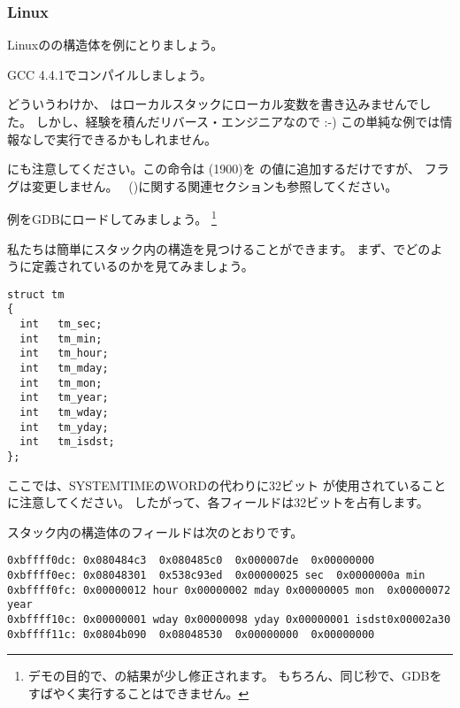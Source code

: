 ﻿\subsubsection{Linux}

Linuxのの構造体を例にとりましょう。



GCC 4.4.1でコンパイルしましょう。



どういうわけか、 \IDA はローカルスタックにローカル変数を書き込みませんでした。
しかし、経験を積んだリバース・エンジニアなので :-) この単純な例では情報なしで実行できるかもしれません。


にも注意してください。この命令は (1900)を \EAX の値に追加するだけですが、
フラグは変更しません。 \LEA{}~()に関する関連セクションも参照してください。


例をGDBにロードしてみましょう。
\footnote{デモの目的で、の結果が少し修正されます。 
もちろん、同じ秒で、GDBをすばやく実行することはできません。}



私たちは簡単にスタック内の構造を見つけることができます。
まず、でどのように定義されているのかを見てみましょう。

\begin{lstlisting}[caption=time.h, label=struct_tm,style=customc]
struct tm
{
  int	tm_sec;
  int	tm_min;
  int	tm_hour;
  int	tm_mday;
  int	tm_mon;
  int	tm_year;
  int	tm_wday;
  int	tm_yday;
  int	tm_isdst;
};
\end{lstlisting}

ここでは、SYSTEMTIMEのWORDの代わりに32ビット \Tint 
が使用されていることに注意してください。 
したがって、各フィールドは32ビットを占有します。

スタック内の構造体のフィールドは次のとおりです。

\begin{lstlisting}
0xbffff0dc:	0x080484c3	0x080485c0	0x000007de	0x00000000
0xbffff0ec:	0x08048301	0x538c93ed	0x00000025 sec	0x0000000a min
0xbffff0fc:	0x00000012 hour	0x00000002 mday	0x00000005 mon 	0x00000072 year
0xbffff10c:	0x00000001 wday	0x00000098 yday	0x00000001 isdst0x00002a30
0xbffff11c:	0x0804b090	0x08048530	0x00000000	0x00000000
\end{lstlisting}

